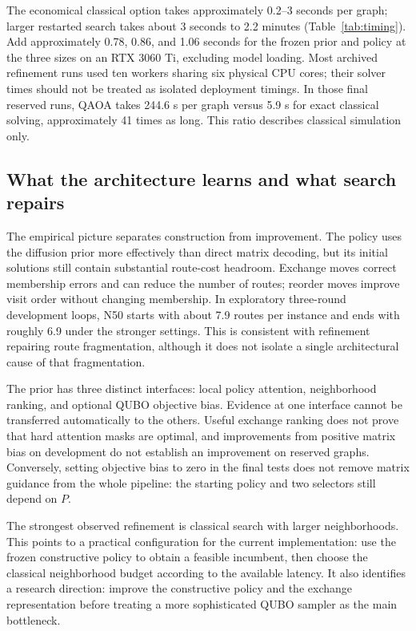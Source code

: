 \documentclass[11pt,a4paper]{article}
\begin{document}
The economical classical option takes approximately 0.2--3 seconds per
graph; larger restarted search takes about 3 seconds to 2.2 minutes
(Table~\ref{tab:timing}). Add approximately 0.78, 0.86, and 1.06 seconds
for the frozen prior and policy at the three sizes on an RTX 3060 Ti,
excluding model loading. Most archived refinement runs used ten workers
sharing six physical CPU cores; their solver times should not be treated
as isolated deployment timings. In those final reserved runs, QAOA takes
244.6 s per graph versus 5.9 s for exact classical solving, approximately
41 times as long. This ratio describes classical simulation only.

\subsection{What the architecture learns and what search repairs}

The empirical picture separates construction from improvement. The policy
uses the diffusion prior more effectively than direct matrix decoding, but
its initial solutions still contain substantial route-cost headroom.
Exchange moves correct membership errors and can reduce the number of
routes; reorder moves improve visit order without changing membership.
In exploratory three-round development loops, N50 starts with about 7.9
routes per instance and ends with roughly 6.9 under the stronger settings.
This is consistent with refinement repairing route fragmentation, although
it does not isolate a single architectural cause of that fragmentation.

The prior has three distinct interfaces: local policy attention,
neighborhood ranking, and optional QUBO objective bias. Evidence at one
interface cannot be transferred automatically to the others. Useful
exchange ranking does not prove that hard attention masks are optimal,
and improvements from positive matrix bias on development do not establish
an improvement on reserved graphs. Conversely, setting objective bias to
zero in the final tests does not remove matrix guidance from the whole
pipeline: the starting policy and two selectors still depend on $P$.

The strongest observed refinement is classical search with larger
neighborhoods. This points to a practical configuration for the current
implementation: use the frozen constructive policy to obtain a feasible
incumbent, then choose the classical neighborhood budget according to the
available latency. It also identifies a research direction: improve the
constructive policy and the exchange representation before treating a
more sophisticated QUBO sampler as the main bottleneck.
\end{document}
